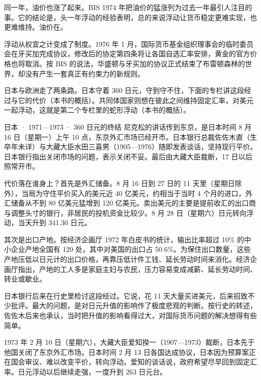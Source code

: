 同一年，油价也涨了起来。BIS 1974 年把油价的猛涨列为过去一年最引人注目的事\cite{bis1974}。它的结论是，头一年浮动的经验表明，总的来说浮动让货币稳定更难实现，也更难维持\cite{bis1974}。油价在。

浮动从权宜之计变成了制度。1976 年 1 月，国际货币基金组织理事会的临时委员会在牙买加完成协议，修改后的协定第四条将让各国自选汇率安排，黄金的官方价格也将取消\cite{bis1976}。按 BIS 的说法，华盛顿与牙买加的协议正式结束了布雷顿森林的世界，却没有产生一套真正有约束力的新规则\cite{bis1976}。

日本与欧洲走了两条路。日本守着 360 日元，守到守不住，下面的专栏讲这段经过与它的代价（本书的概括）。共同体国家则想在彼此之间维持固定汇率，对美元一起浮动，这就是第二个专栏里的蛇形浮动（本书的概括）。

\begin{case}{日本 · 1971—1973 · 360 日元的终结}
尼克松的讲话传到东京，是日本时间 8 月 16 日（星期一）上午 10 点，东京外汇市场已经开市\cite{boj1986}。日本银行总裁佐佐木直（生卒年未详）与大藏大臣水田三喜男（1905—1976）随即发表谈话，坚持现行平价\cite{boj1986,loc46}。日本银行指出关闭市场的问题，表示关闭不妥\cite{boj1986}。最后由大藏大臣裁断，17 日以后照常开市\cite{boj1986}。

代价落在谁身上？首先是外汇储备。8 月 16 日到 27 日的 11 天里（星期日除外），当局为守住平价买入的美元近 40 亿美元，约相当于当时 4 个月的进口，外汇储备从不到 80 亿美元猛增到 120 亿美元\cite{boj1986}。卖出美元的主要是提前收汇的出口商与调整头寸的银行，非居民的投机资金比较少\cite{boj1986}。8 月 28 日（星期六）日元转向浮动，当天升到 341.30 日元\cite{boj1986}。

其次是出口产地。按经济企画厅 1972 年白皮书的统计，输出比率超过 10\% 的中小企业产地全国有 120 处，其中对美国的出口占 50.6\%\cite{epa1972}。为保住出口数量，这些产地压低以日元计的出口价格，再靠压低计件工钱、延长劳动时间来消化\cite{epa1972}。经济企画厅指出，产地的工人多是家庭主妇与农民，压力容易变成减薪、延长劳动时间、转业或歇业\cite{epa1972}。

日本银行后来在行史里检讨这段经过。它说，花 11 天大量买进美元，后来招致不少批评\cite{boj1986}。最大的问题，是对日元升值的影响作了极度悲观的判断\cite{boj1986}。按行史的转述，佐佐木后来也承认，当时把升值的影响看得过大，对国际货币问题的解决想得有些简单\cite{boj1986}。

1973 年 2 月 10 日（星期六），大藏大臣爱知揆一（1907—1973）裁断，日本先于他国关闭了东京外汇市场\cite{boj1986,loc46}。日本时间 2 月 13 日各国达成协议，日本因为预算案正在国会审议、难以改变平价，转向浮动\cite{boj1986}。爱知的谈话说，政府希望尽早回到固定汇率\cite{boj1986}。日元浮动以后继续走强，一度升到 263 日元台\cite{boj1986}。
\end{case}

